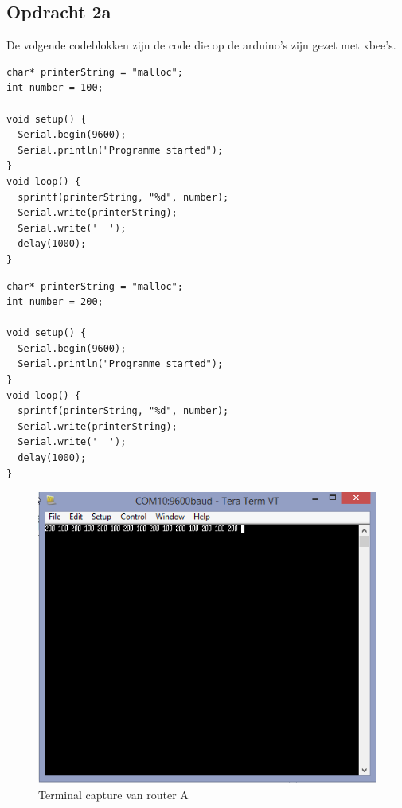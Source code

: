 \documentclass[12pt]{article}
\begin{document}
\subsection{Opdracht 2a}
De volgende codeblokken zijn de code die op de arduino's zijn gezet met xbee's.
\begin{lstlisting}
char* printerString = "malloc";
int number = 100;

void setup() {
  Serial.begin(9600);
  Serial.println("Programme started");
}
void loop() {
  sprintf(printerString, "%d", number);
  Serial.write(printerString);
  Serial.write('  ');
  delay(1000);
}
\end{lstlisting}
\begin{lstlisting}
char* printerString = "malloc";
int number = 200;

void setup() {
  Serial.begin(9600);
  Serial.println("Programme started");
}
void loop() {
  sprintf(printerString, "%d", number);
  Serial.write(printerString);
  Serial.write('  ');
  delay(1000);
}
\end{lstlisting}
\begin{center}
\begin{figure}[h]
\includegraphics[scale=0.7]{100-200.jpg}
\caption{Terminal capture van router A}
\label{fig:output8}
\end{figure}   
\end{center}
\newpage
\end{document}
